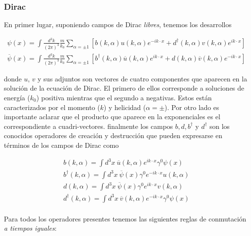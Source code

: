 \documentclass[tickz]{article}
\numberwithin{equation}{section}
\begin{document}
\subsubsection{Dirac}\label{sec_dirac}

En primer lugar, suponiendo campos de Dirac \textit{libres}, tenemos los desarrollos 

\begin{equation}\label{dirac}
\begin{aligned}
\psi(x) = \int \frac{d^3k}{(2\pi)^3}\frac{m}{k_0}\sum_{\alpha=\pm 1 }\left[b(k,\alpha)u(k,\alpha) e^{-i k \cdot x} + d^{\dagger}(k,\alpha)v(k,\alpha)e^{i k \cdot x}\right]\\
\overline{\psi}(x) = \int \frac{d^3k}{(2\pi)^3}\frac{m}{k_0}\sum_{\alpha=\pm 1 }\left[b^{\dagger}(k,\alpha)\overline{u}(k,\alpha) e^{i k \cdot x} + d(k,\alpha)\overline{v}(k,\alpha)e^{-i k \cdot x}\right]
\end{aligned}
\end{equation} 

donde $ u $, $ v $ y sus adjuntos son vectores de cuatro componentes que aparecen en la solución de la ecuación de Dirac. El primero de ellos corresponde a soluciones de energía ($ k_0 $) positiva mientras que el segundo a negativas. Estos están caracterizados por el momento ($ k $) y helicidad ($ \alpha=\pm $). Por otro lado es importante aclarar que el producto que aparece en la exponenciales es el correspondiente a cuadri-vectores. finalmente los campos $ b,d,b^{\dagger} $ y $ d^{\dagger} $ son los conocidos operadores de creación y destrucción que pueden expresarse en términos de los campos de Dirac como

\begin{equation}\label{key}
\begin{aligned}
b(k,\alpha)=\int d^3x \ \overline{u}(k,\alpha)e^{i k \cdot x}\gamma^0\psi (x)\\
b^{\dagger}(k,\alpha)=\int d^3x \ \overline{\psi}(x)\gamma^0 e^{-i k \cdot x}u(k,\alpha)\\
d(k,\alpha)=\int d^3x \ \overline{\psi}(x)\gamma^0 e^{i k \cdot x}v(k,\alpha)\\
d^{\dagger}(k,\alpha)=\int d^3x \ \overline{v}(k,\alpha)e^{-i k \cdot x}\gamma^0\psi (x)\\
\end{aligned}
\end{equation}

Para todos los operadores presentes tenemos las siguientes reglas de conmutación \textit{a tiempos iguales}:
\end{document}
